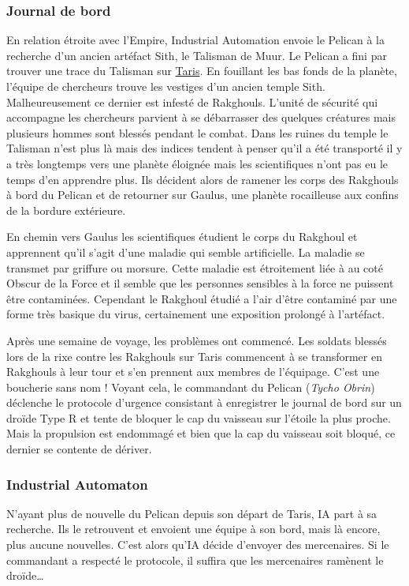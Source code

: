 \subsubsection{Journal de bord}
\label{sec:pelican-jdb}
En relation étroite avec l’Empire, Industrial Automation envoie le Pelican à la recherche d’un ancien artéfact Sith, le Talisman de Muur. Le Pelican a fini par trouver une trace du Talisman sur \href{http://fr.starwars.wikia.com/wiki/Taris}{Taris}. En fouillant les bas fonds de la planète, l’équipe de chercheurs trouve les vestiges d'un ancien temple Sith. Malheureusement ce dernier est infesté de Rakghouls. L’unité de sécurité qui accompagne les chercheurs parvient à se débarrasser des quelques créatures mais plusieurs hommes sont blessés pendant le combat. Dans les ruines du temple le Talisman n’est plus là mais des indices tendent à penser qu’il a été transporté il y a très longtemps vers une planète éloignée mais les scientifiques n'ont pas eu le temps d'en apprendre plus. Ils décident alors de ramener les corps des Rakghouls à bord du Pelican et de retourner sur Gaulus, une planète rocailleuse aux confins de la bordure extérieure.

En chemin vers Gaulus les scientifiques étudient le corps du Rakghoul et apprennent qu’il s’agit d’une maladie qui semble artificielle. La maladie se transmet par griffure ou morsure. Cette maladie est étroitement liée à au coté Obscur de la Force et il semble que les personnes sensibles à la force ne puissent être contaminées. Cependant le Rakghoul étudié a l’air d’être contaminé par une forme très basique du virus, certainement une exposition prolongé à l’artéfact.

Après une semaine de voyage, les problèmes ont commencé. Les soldats blessés lors de la rixe contre les Rakghouls sur Taris commencent à se transformer en Rakghouls à leur tour et s’en prennent aux membres de l’équipage. C’est une boucherie sans nom ! Voyant cela, le commandant du Pelican (\emph{Tycho Obrin}) déclenche le protocole d’urgence consistant à enregistrer le journal de bord sur un droïde Type R et tente de bloquer le cap du vaisseau sur l’étoile la plus proche. Mais la propulsion est endommagé et bien que la cap du vaisseau soit bloqué, ce dernier se contente de dériver.

\vspace{10\baselineskip}
\subsubsection{Industrial Automaton}
N’ayant plus de nouvelle du Pelican depuis son départ de Taris, IA part à sa recherche. Ils le retrouvent et envoient une équipe à son bord, mais là encore, plus aucune nouvelles. C’est alors qu’IA décide d’envoyer des mercenaires. Si le commandant a respecté le protocole, il suffira que les mercenaires ramènent le droïde\ldots

